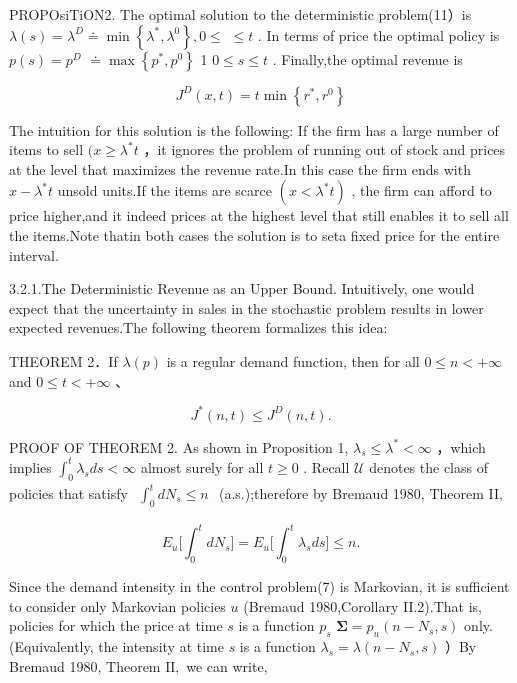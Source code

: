 PROPOsiTiON2. The optimal solution to the deterministic problem(11）is
\(\lambda ( s ) = \lambda ^ { D } \doteq \operatorname* { m i n } \left\{ \lambda ^ { * } , \lambda ^ { 0 } \right\} , 0 \le\)
\(\leq t\) . In terms of price the optimal policy is
\(p ( s ) = p ^ { D }\)
\(\doteq \operatorname* { m a x } \left\{ p ^ { * } , p ^ { 0 } \right\}\)
1 \(0 \leq s \leq t\) . Finally,the optimal revenue is

\[
J ^ { D } ( x , t ) = t \operatorname* { m i n } \left\{ r ^ { * } , r ^ { 0 } \right\}
\]

The intuition for this solution is the following: If the firm has a
large number of items to sell \(( x \geq \lambda ^ { * } t\) ，it
ignores the problem of running out of stock and prices at the level that
maximizes the revenue rate.In this case the firm ends with
\(x - \lambda ^ { * } t\) unsold units.If the items are scarce
\(( x < \lambda ^ { * } t )\) , the firm can afford to price higher,and
it indeed prices at the highest level that still enables it to sell all
the items.Note thatin both cases the solution is to seta fixed price for
the entire interval.

3.2.1.The Deterministic Revenue as an Upper Bound. Intuitively, one
would expect that the uncertainty in sales in the stochastic problem
results in lower expected revenues.The following theorem formalizes this
idea:

THEOREM 2．If \(\lambda ( p )\) is a regular demand function, then for
all \(0 \leq n < + \infty\) and \(0 \leq t < + \infty\) 、

\[
J ^ { * } ( n , t ) \leq J ^ { D } ( n , t ) .
\]

PROOF OF THEOREM 2. As shown in Proposition 1,
\(\lambda _ { s } \le \lambda ^ { * } < \infty\) ，which implies
\(\int _ { 0 } ^ { t } \lambda _ { s } d s < \infty\) almost surely for
all \(t \geq 0\) . Recall \(\mathcal { U }\) denotes the class of
policies that satisfy
\(\begin{array} { r } { \int _ { 0 } ^ { t } d N _ { s } \le n } \end{array}\)
(a.s.);therefore by Bremaud 1980, Theorem II,

\[
E _ { u } \bigg [ \int _ { 0 } ^ { t } d N _ { s } \bigg ] = E _ { u } \bigg [ \int _ { 0 } ^ { t } \lambda _ { s } d s \bigg ] \leq n .
\]

Since the demand intensity in the control problem(7) is Markovian, it is
sufficient to consider only Markovian policies \(u\) (Bremaud
1980,Corollary II.2).That is, policies for which the price at time \(s\)
is a function \(p _ { s }\)
\(\mathbf { \Sigma } = p _ { u } ( n - N _ { s } , s )\)
only.(Equivalently, the intensity at time \(s\) is a function
\(\lambda _ { s } = \lambda ( n - N _ { s } , s )\) ）By Bremaud 1980,
Theorem \({ \mathrm { I I } } ,\) we can write,


